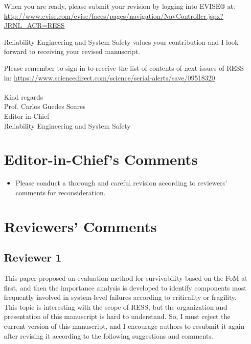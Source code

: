 \documentclass{article}
\begin{document}
When you are ready, please submit your revision by logging into EVISE® at: \url{http://www.evise.com/evise/faces/pages/navigation/NavController.jspx?JRNL_ACR=RESS}

Reliability Engineering and System Safety values your contribution and I look forward to receiving your revised manuscript.

Please remember to sign in to receive the list of contents of next issues of RESS in:
\url{https://www.sciencedirect.com/science/serial-alerts/save/09518320} \\ \\
Kind regards \\
Prof. Carlos Guedes Soares \\
Editor-in-Chief \\
Reliability Engineering and System Safety

\section{Editor-in-Chief's Comments}
\label{sec:editor}

\begin{itemize}
  \item Please conduct a thorough and careful revision according to reviewers' comments for reconsideration.
\end{itemize}

\section{Reviewers' Comments}
\label{sec:reviewers}

\subsection{Reviewer 1}
\label{sec:reviewer:r1}
This paper proposed an evaluation method for survivability based on the FoM at first, and then the importance analysis is developed to identify components most frequently involved in system-level failures according to criticality or fragility. This topic is interesting with the scope of RESS, but the organization and presentation of this manuscript is hard to understand. So, I must reject the current version of this manuscript, and I encourage authors to resubmit it again after revising it according to the following suggestions and comments.
\end{document}
